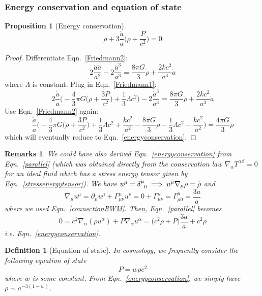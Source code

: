 \documentclass[a4paper]{article}
\newtheorem{remarks}{Remarks}[section]
\theoremstyle{new}
\newtheorem{defi}{Definition}[section]
\newtheorem{prop}{Proposition}[section]
\begin{document}
\subsubsection{Energy conservation and equation of state}
\begin{prop}[Energy conservation]
\begin{equation}
\dot{\rho}+3\frac{\dot{a}}{a}\bigg(\rho+\frac{P}{c^2}\bigg)=0\label{energyconservation}
\end{equation}
\end{prop}
\begin{proof}
Differentiate Eqn.~\ref{Friedmann2}:
$$2\frac{\dot{a}\ddot{a}}{a^2}-2\frac{\dot{a}^3}{a^3}=\frac{8\pi G}{3}\dot{\rho}+\frac{2kc^2}{a^3}\dot{a}$$
where $\Lambda$ is constant. Plug in Eqn.~\ref{Friedmann1}:
$$2\frac{\dot{a}}{a}\bigg(-\frac{4}{3}\pi G\bigg(\rho+\frac{3P}{c^2}\bigg)+\frac{1}{3}\Lambda c^2\bigg)-2\frac{\dot{a}^3}{a^3}=\frac{8\pi G}{3}\dot{\rho}+\frac{2kc^2}{a^3}\dot{a}$$
Use Eqn.~\ref{Friedmann2} again:
$$\frac{\dot{a}}{a}\bigg(-\frac{4}{3}\pi G\bigg(\rho+\frac{3P}{c^2}\bigg)+\frac{1}{3}\Lambda c^2+\frac{kc^2}{a^2}-\frac{8\pi G}{3}\rho-\frac{1}{3}\Lambda c^2-\frac{kc^2}{a^2}\bigg)=\frac{4\pi G}{3}\dot{\rho}$$
which will eventually reduce to Eqn.~\ref{energyconservation}.
\end{proof}
\begin{remarks}
We could have also derived Eqn.~\ref{energyconservation} from Eqn.~\ref{parallel} (which was obtained directly from the conservation law $\nabla_\alpha T^{\alpha\beta}=0$ for an ideal fluid which has a stress energy tensor given by Eqn.~\ref{stressenergytensor}). We have $u^\mu=\tensor*{\delta}{*_{}^{\mu}_{0}}\implies u^\mu\nabla_\mu\rho=\dot{\rho}$ and 
$$\nabla_\mu u^\mu=\partial_\mu u^\mu+\Gamma^\mu_{\mu\nu}u^\nu=0+\Gamma^\mu_{\mu\nu}=\Gamma^\mu_{\mu0}=\frac{3\dot{a}}{a}$$
where we used Eqn.~\ref{connectionRWM}. Then, Eqn.~\ref{parallel} becomes
$$0=c^2\nabla_\alpha(\rho u^\alpha)+P\nabla_\alpha u^\alpha=\bigg(c^2\rho+P\bigg)\frac{3\dot{a}}{a}+c^2\dot{\rho}$$
i.e. Eqn.~\ref{energyconservation}.
\end{remarks}
\begin{defi}[Equation of state]
In cosmology, we frequently consider the following equation of state
\begin{equation}
    P=w\rho c^2\label{eqnofstate}
\end{equation}
where $w$ is some constant. From Eqn.~\ref{energyconservation}, we simply have $\rho\sim a^{-3(1+w)}$.
\end{defi}
\end{document}
